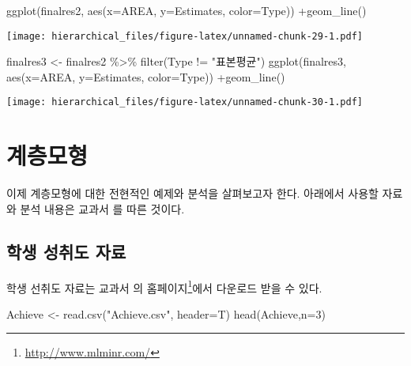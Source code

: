 \documentclass[
]{book}
\newenvironment{Shaded}{\begin{snugshade}}{\end{snugshade}}
\newcommand{\AttributeTok}[1]{\textcolor[rgb]{0.77,0.63,0.00}{#1}}
\newcommand{\DecValTok}[1]{\textcolor[rgb]{0.00,0.00,0.81}{#1}}
\newcommand{\FunctionTok}[1]{\textcolor[rgb]{0.00,0.00,0.00}{#1}}
\newcommand{\NormalTok}[1]{#1}
\newcommand{\OtherTok}[1]{\textcolor[rgb]{0.56,0.35,0.01}{#1}}
\newcommand{\SpecialCharTok}[1]{\textcolor[rgb]{0.00,0.00,0.00}{#1}}
\newcommand{\StringTok}[1]{\textcolor[rgb]{0.31,0.60,0.02}{#1}}
\renewcommand{\href}[2]{#2\footnote{\url{#1}}}
\begin{document}
\begin{Shaded}
\begin{Highlighting}[]
\FunctionTok{ggplot}\NormalTok{(finalres2, }\FunctionTok{aes}\NormalTok{(}\AttributeTok{x=}\NormalTok{AREA, }\AttributeTok{y=}\NormalTok{Estimates, }\AttributeTok{color=}\NormalTok{Type)) }\SpecialCharTok{+}\FunctionTok{geom\_line}\NormalTok{()}
\end{Highlighting}
\end{Shaded}

\texttt{[image: hierarchical\_files/figure-latex/unnamed-chunk-29-1.pdf]}

\begin{Shaded}
\begin{Highlighting}[]
\NormalTok{finalres3 }\OtherTok{\textless{}{-}}\NormalTok{ finalres2 }\SpecialCharTok{\%\textgreater{}\%} \FunctionTok{filter}\NormalTok{(Type }\SpecialCharTok{!=} \StringTok{"표본평균"}\NormalTok{)}
\FunctionTok{ggplot}\NormalTok{(finalres3, }\FunctionTok{aes}\NormalTok{(}\AttributeTok{x=}\NormalTok{AREA, }\AttributeTok{y=}\NormalTok{Estimates, }\AttributeTok{color=}\NormalTok{Type)) }\SpecialCharTok{+}\FunctionTok{geom\_line}\NormalTok{()}
\end{Highlighting}
\end{Shaded}

\texttt{[image: hierarchical\_files/figure-latex/unnamed-chunk-30-1.pdf]}

\hypertarget{school}{%
\chapter{계층모형}\label{school}}

이제 계층모형에 대한 전현적인 예제와 분석을 살펴보고자 한다. 아래에서 사용할 자료와 분석 내용은
교과서 \citep{finch2019multilevel}를 따른 것이다.

\hypertarget{uxd559uxc0dd-uxc131uxcde8uxb3c4-uxc790uxb8cc}{%
\section{학생 성취도 자료}\label{uxd559uxc0dd-uxc131uxcde8uxb3c4-uxc790uxb8cc}}

학생 선취도 자료는 교과서 \citep{finch2019multilevel} 의 \href{http://www.mlminr.com/}{홈페이지}에서 다운로드 받을 수 있다.

\begin{Shaded}
\begin{Highlighting}[]
\NormalTok{Achieve }\OtherTok{\textless{}{-}} \FunctionTok{read.csv}\NormalTok{(}\StringTok{"Achieve.csv"}\NormalTok{, }\AttributeTok{header=}\NormalTok{T)}
\FunctionTok{head}\NormalTok{(Achieve,}\AttributeTok{n=}\DecValTok{3}\NormalTok{)}
\end{Highlighting}
\end{Shaded}
\end{document}
